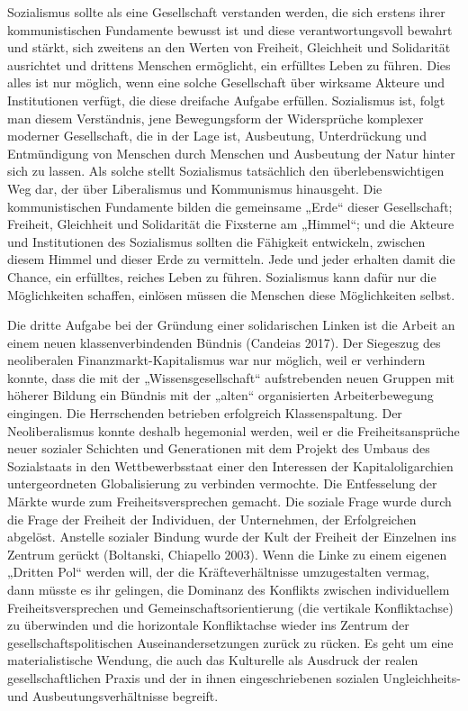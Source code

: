 \begin{multicols*}{2}
Sozialismus sollte als eine Gesellschaft verstanden werden, die sich erstens ihrer kommunistischen Fundamente bewusst ist und diese verantwortungsvoll bewahrt und stärkt, sich zweitens an den Werten von Freiheit, Gleichheit und Solidarität ausrichtet und drittens Menschen ermöglicht, ein erfülltes Leben zu führen. Dies alles ist nur möglich, wenn eine solche Gesellschaft über wirksame Akteure und Institutionen verfügt, die diese dreifache Aufgabe erfüllen. Sozialismus ist, folgt man diesem Verständnis, jene Bewegungsform der Widersprüche komplexer moderner Gesellschaft, die in der Lage ist, Ausbeutung, Unterdrückung und Entmündigung von Menschen durch Menschen und Ausbeutung der Natur hinter sich zu lassen. Als solche stellt Sozialismus tatsächlich den überlebenswichtigen Weg dar, der über Liberalismus und Kommunismus hinausgeht. Die kommunistischen Fundamente bilden die gemeinsame „Erde“ dieser Gesellschaft; Freiheit, Gleichheit und Solidarität die Fixsterne am „Himmel“; und die Akteure und Institutionen des Sozialismus sollten die Fähigkeit entwickeln, zwischen diesem Himmel und dieser Erde zu vermitteln. Jede und jeder erhalten damit die Chance, ein erfülltes, reiches Leben zu führen. Sozialismus kann dafür nur die Möglichkeiten schaffen, einlösen müssen die Menschen diese Möglichkeiten selbst. 

Die dritte Aufgabe bei der Gründung einer solidarischen Linken ist die Arbeit an einem neuen klassenverbindenden Bündnis (Candeias 2017). Der Siegeszug des neoliberalen Finanzmarkt-Kapitalismus war nur möglich, weil er verhindern konnte, dass die mit der „Wissensgesellschaft“ aufstrebenden neuen Gruppen mit höherer Bildung ein Bündnis mit der „alten“ organisierten Arbeiterbewegung eingingen. Die Herrschenden betrieben erfolgreich Klassenspaltung. Der Neoliberalismus konnte deshalb hegemonial werden, weil er die Freiheitsansprüche neuer sozialer Schichten und Generationen mit dem Projekt des Umbaus des Sozialstaats in den Wettbewerbsstaat einer den Interessen der Kapitaloligarchien untergeordneten Globalisierung zu verbinden vermochte. Die Entfesselung der Märkte wurde zum Freiheitsversprechen gemacht. Die soziale Frage wurde durch die Frage der Freiheit der Individuen, der Unternehmen, der Erfolgreichen abgelöst. Anstelle sozialer Bindung wurde der Kult der Freiheit der Einzelnen ins Zentrum gerückt (Boltanski, Chiapello 2003). Wenn die Linke zu einem eigenen „Dritten Pol“ werden will, der die Kräfteverhältnisse umzugestalten vermag, dann müsste es ihr gelingen, die Dominanz des Konflikts zwischen individuellem Freiheitsversprechen und Gemeinschaftsorientierung (die vertikale Konfliktachse) zu überwinden und die horizontale Konfliktachse wieder ins Zentrum der gesellschaftspolitischen Auseinandersetzungen zurück zu rücken. Es geht um eine materialistische Wendung, die auch das Kulturelle als Ausdruck der realen gesellschaftlichen Praxis und der in ihnen eingeschriebenen sozialen Ungleichheits- und Ausbeutungsverhältnisse begreift.


\end{multicols*}
